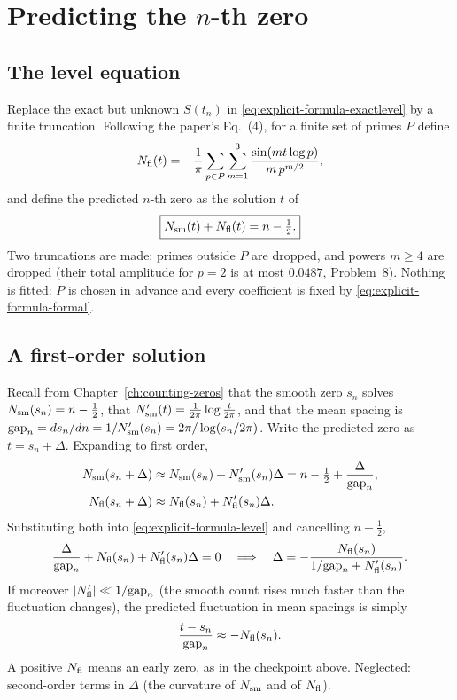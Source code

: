 \section{Predicting the $n$-th zero}\label{sec:explicit-formula-predict}

\subsection{The level equation}

Replace the exact but unknown $S(t_n)$ in \cref{eq:explicit-formula-exactlevel} by a finite truncation. Following the paper's Eq.~(4), for a finite set of primes $P$ define
\begin{equation}
N_{\mathrm{fl}}(t)=-\frac{1}{\pi}\sum_{p\in P}\sum_{m=1}^{3}\frac{\sin(mt\log p)}{m\,p^{m/2}},
\label{eq:explicit-formula-nfl}
\end{equation}
and define the predicted $n$-th zero as the solution $t$ of
\begin{equation}
\boxed{N_{\mathrm{sm}}(t)+N_{\mathrm{fl}}(t)=n-\tfrac12 .}
\label{eq:explicit-formula-level}
\end{equation}
Two truncations are made: primes outside $P$ are dropped, and powers $m\ge4$ are dropped (their total amplitude for $p=2$ is at most $0.0487$, Problem~8). Nothing is fitted: $P$ is chosen in advance and every coefficient is fixed by \cref{eq:explicit-formula-formal}.

\subsection{A first-order solution}

Recall from Chapter~\ref{ch:counting-zeros} that the smooth zero $s_n$ solves $N_{\mathrm{sm}}(s_n)=n-\tfrac12$, that $N_{\mathrm{sm}}'(t)=\frac{1}{2\pi}\log\frac{t}{2\pi}$, and that the mean spacing is $\mathrm{gap}_n=ds_n/dn=1/N_{\mathrm{sm}}'(s_n)=2\pi/\log(s_n/2\pi)$. Write the predicted zero as $t=s_n+\Delta$. Expanding to first order,
\begin{align}
N_{\mathrm{sm}}(s_n+\Delta)&\approx N_{\mathrm{sm}}(s_n)+N_{\mathrm{sm}}'(s_n)\Delta=n-\tfrac12+\frac{\Delta}{\mathrm{gap}_n},\label{eq:explicit-formula-lin1}\\
N_{\mathrm{fl}}(s_n+\Delta)&\approx N_{\mathrm{fl}}(s_n)+N_{\mathrm{fl}}'(s_n)\Delta.\label{eq:explicit-formula-lin2}
\end{align}
Substituting both into \cref{eq:explicit-formula-level} and cancelling $n-\tfrac12$,
\begin{equation}
\frac{\Delta}{\mathrm{gap}_n}+N_{\mathrm{fl}}(s_n)+N_{\mathrm{fl}}'(s_n)\Delta=0
\quad\Longrightarrow\quad
\Delta=-\frac{N_{\mathrm{fl}}(s_n)}{1/\mathrm{gap}_n+N_{\mathrm{fl}}'(s_n)} .
\label{eq:explicit-formula-delta}
\end{equation}
If moreover $\left\lvert N_{\mathrm{fl}}'\right\rvert\ll1/\mathrm{gap}_n$ (the smooth count rises much faster than the fluctuation changes), the predicted fluctuation in mean spacings is simply
\begin{equation}
\frac{t-s_n}{\mathrm{gap}_n}\approx-N_{\mathrm{fl}}(s_n).
\label{eq:explicit-formula-firstorder}
\end{equation}
A positive $N_{\mathrm{fl}}$ means an early zero, as in the checkpoint above. Neglected: second-order terms in $\Delta$ (the curvature of $N_{\mathrm{sm}}$ and of $N_{\mathrm{fl}}$).

